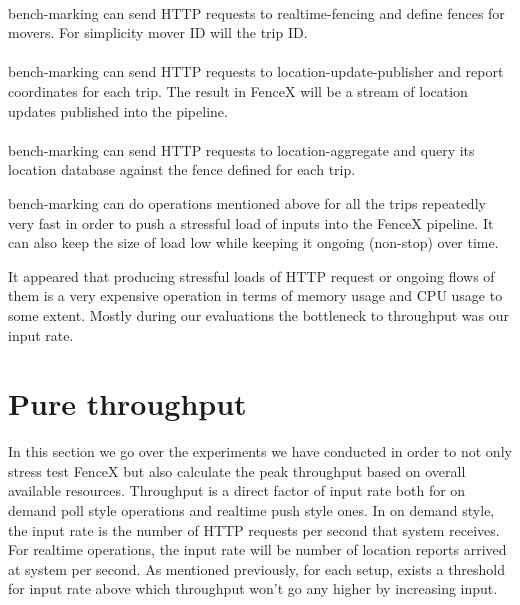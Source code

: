 \documentclass[a4]{report}
\begin{document}
    \paragraph{}
    bench-marking can send HTTP requests to realtime-fencing and define fences for movers.
    For simplicity mover ID will the trip ID.

    \paragraph{}
    bench-marking can send HTTP requests to location-update-publisher and report coordinates for each trip.
    The result in FenceX will be a stream of location updates published into the pipeline.

    \paragraph{}
    bench-marking can send HTTP requests to location-aggregate and query its location database against the fence
    defined for each trip.

    bench-marking can do operations mentioned above for all the trips repeatedly very fast in order to push a
    stressful load of inputs into the FenceX pipeline.
    It can also keep the size of load low while keeping it ongoing (non-stop) over time.

    It appeared that producing stressful loads of HTTP request or ongoing flows of them is a very expensive operation
    in terms of memory usage and CPU usage to some extent.
    Mostly during our evaluations the bottleneck to throughput was our input rate.


    \section{Pure throughput}
    In this section we go over the experiments we have conducted in order to not only stress test FenceX but also
    calculate the peak throughput based on overall available resources.
    Throughput is a direct factor of input rate both for on demand poll style operations and realtime push style ones.
    In on demand style, the input rate is the number of HTTP requests per second that system receives.
    For realtime operations, the input rate will be number of location reports arrived at system per second.
    As mentioned previously, for each setup, exists a threshold for input rate above which throughput won't go any
    higher by increasing input.
\end{document}

